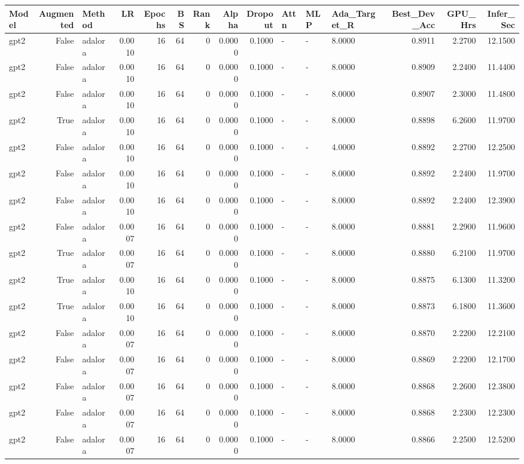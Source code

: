 \begin{tabular}{lrlrrrrrrlllrrr}
\toprule
Model & Augmented & Method & LR & Epochs & BS & Rank & Alpha & Dropout & Attn & MLP & Ada_Target_R & Best_Dev_Acc & GPU_Hrs & Infer_Sec \\
\midrule
gpt2 & False & adalora & 0.0010 & 16 & 64 & 0 & 0.0000 & 0.1000 & - & - & 8.0000 & 0.8911 & 2.2700 & 12.1500 \\
gpt2 & False & adalora & 0.0010 & 16 & 64 & 0 & 0.0000 & 0.1000 & - & - & 8.0000 & 0.8909 & 2.2400 & 11.4400 \\
gpt2 & False & adalora & 0.0010 & 16 & 64 & 0 & 0.0000 & 0.1000 & - & - & 8.0000 & 0.8907 & 2.3000 & 11.4800 \\
gpt2 & True & adalora & 0.0010 & 16 & 64 & 0 & 0.0000 & 0.1000 & - & - & 8.0000 & 0.8898 & 6.2600 & 11.9700 \\
gpt2 & False & adalora & 0.0010 & 16 & 64 & 0 & 0.0000 & 0.1000 & - & - & 4.0000 & 0.8892 & 2.2700 & 12.2500 \\
gpt2 & False & adalora & 0.0010 & 16 & 64 & 0 & 0.0000 & 0.1000 & - & - & 8.0000 & 0.8892 & 2.2400 & 11.9700 \\
gpt2 & False & adalora & 0.0010 & 16 & 64 & 0 & 0.0000 & 0.1000 & - & - & 8.0000 & 0.8892 & 2.2400 & 12.3900 \\
gpt2 & False & adalora & 0.0007 & 16 & 64 & 0 & 0.0000 & 0.1000 & - & - & 8.0000 & 0.8881 & 2.2900 & 11.9600 \\
gpt2 & True & adalora & 0.0007 & 16 & 64 & 0 & 0.0000 & 0.1000 & - & - & 8.0000 & 0.8880 & 6.2100 & 11.9700 \\
gpt2 & True & adalora & 0.0010 & 16 & 64 & 0 & 0.0000 & 0.1000 & - & - & 8.0000 & 0.8875 & 6.1300 & 11.3200 \\
gpt2 & True & adalora & 0.0010 & 16 & 64 & 0 & 0.0000 & 0.1000 & - & - & 8.0000 & 0.8873 & 6.1800 & 11.3600 \\
gpt2 & False & adalora & 0.0007 & 16 & 64 & 0 & 0.0000 & 0.1000 & - & - & 8.0000 & 0.8870 & 2.2200 & 12.2100 \\
gpt2 & False & adalora & 0.0007 & 16 & 64 & 0 & 0.0000 & 0.1000 & - & - & 8.0000 & 0.8869 & 2.2200 & 12.1700 \\
gpt2 & False & adalora & 0.0007 & 16 & 64 & 0 & 0.0000 & 0.1000 & - & - & 8.0000 & 0.8868 & 2.2600 & 12.3800 \\
gpt2 & False & adalora & 0.0007 & 16 & 64 & 0 & 0.0000 & 0.1000 & - & - & 8.0000 & 0.8868 & 2.2300 & 12.2300 \\
gpt2 & False & adalora & 0.0007 & 16 & 64 & 0 & 0.0000 & 0.1000 & - & - & 8.0000 & 0.8866 & 2.2500 & 12.5200 \\

\end{tabular}
